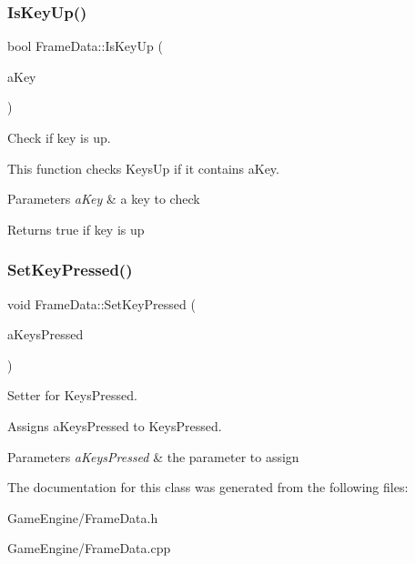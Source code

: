 \subsubsection{IsKeyUp()}
{\footnotesize\ttfamily bool Frame\+Data\+::\+Is\+Key\+Up (\begin{DoxyParamCaption}\item[{S\+D\+L\+\_\+\+Keycode}]{a\+Key }\end{DoxyParamCaption})}



Check if key is up. 

This function checks Keys\+Up if it contains a\+Key. 
\begin{DoxyParams}{Parameters}
{\em a\+Key} & a key to check \\
\hline
\end{DoxyParams}
\begin{DoxyReturn}{Returns}
true if key is up 
\end{DoxyReturn}
\mbox{\label{class_frame_data_af76fe435123acbaa58f50cddd8ee0dcb}} 
\subsubsection{SetKeyPressed()}
{\footnotesize\ttfamily void Frame\+Data\+::\+Set\+Key\+Pressed (\begin{DoxyParamCaption}\item[{shared\+\_\+ptr$<$ unordered\+\_\+set$<$ S\+D\+L\+\_\+\+Keycode $>$$>$}]{a\+Keys\+Pressed }\end{DoxyParamCaption})}



Setter for Keys\+Pressed. 

Assigns a\+Keys\+Pressed to Keys\+Pressed. 
\begin{DoxyParams}{Parameters}
{\em a\+Keys\+Pressed} & the parameter to assign \\
\hline
\end{DoxyParams}


The documentation for this class was generated from the following files\+:\begin{DoxyCompactItemize}
\item 
Game\+Engine/Frame\+Data.\+h\item 
Game\+Engine/Frame\+Data.\+cpp\end{DoxyCompactItemize}
